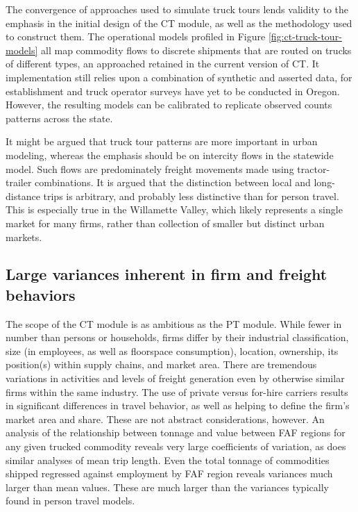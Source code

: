The convergence of approaches used to simulate truck tours lends validity to the emphasis in the initial design of the CT module, as well as the methodology used to construct them. The operational models profiled in Figure \ref{fig:ct-truck-tour-models} all map commodity flows to discrete shipments that are routed on trucks of different types, an approached retained in the current version of CT. It implementation still relies upon a combination of synthetic and asserted data, for establishment and truck operator surveys have yet to be conducted in Oregon. However, the resulting models can be calibrated to replicate observed counts patterns across the state.

It might be argued that truck tour patterns are more important in urban modeling, whereas the emphasis should be on intercity flows in the statewide model. Such flows are predominately freight movements made using tractor-trailer
combinations. It is argued that the distinction between local and long-distance trips is arbitrary, and probably less distinctive than for person travel. This is especially true in the Willamette Valley, which likely represents a single market for many firms, rather than collection of smaller but distinct urban markets. 

\subsection{Large variances inherent in firm and freight behaviors}\label{sec:ct-large-variances}
The scope of the CT module is as ambitious as the PT module. While fewer in number than persons or households, firms differ by their industrial classification, size (in employees, as well as floorspace consumption), location, ownership, its position(s) within supply chains, and market area. There are tremendous variations in activities and levels of freight generation even by otherwise similar firms within the same industry. The use of private versus for-hire carriers results in significant differences in travel behavior, as well as helping to define the firm's market area and share. These are not abstract considerations, however. An analysis of the relationship between tonnage and value between FAF regions for any given trucked commodity reveals very large coefficients of variation, as does similar analyses of mean trip length. Even the total tonnage of commodities shipped regressed against employment by FAF region reveals variances much larger than mean values. These are much larger than the variances typically found in person travel models.

